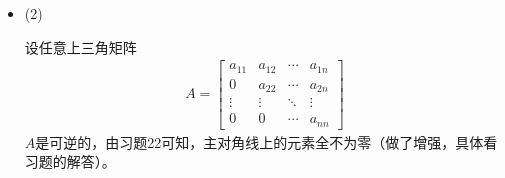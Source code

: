 \documentclass{article}
\begin{document}
\begin{itemize}
  \item (2)

        设任意上三角矩阵
        \begin{align*}
          A = \begin{bmatrix}
                a_{11} & a_{12} & \cdots & a_{1n} \\
                0      & a_{22} & \cdots & a_{2n} \\
                \vdots & \vdots & \ddots & \vdots \\
                0      & 0      & \cdots & a_{nn}
              \end{bmatrix}
        \end{align*}
        $A$是可逆的，由习题22可知，主对角线上的元素全不为零（做了增强，具体看习题的解答）。


\end{itemize}
\end{document}
